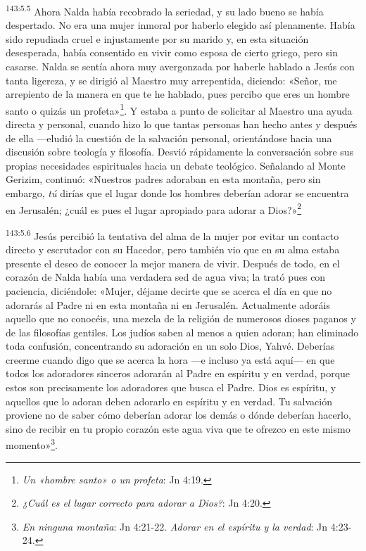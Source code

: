 \par
\textsuperscript{143:5.5} Ahora Nalda había recobrado la seriedad, y su lado bueno se había despertado. No era una mujer inmoral por haberlo elegido así plenamente. Había sido repudiada cruel e injustamente por su marido y, en esta situación desesperada, había consentido en vivir como esposa de cierto griego, pero sin casarse. Nalda se sentía ahora muy avergonzada por haberle hablado a Jesús con tanta ligereza, y se dirigió al Maestro muy arrepentida, diciendo: «Señor, me arrepiento de la manera en que te he hablado, pues percibo que eres un hombre santo o quizás un profeta»\footnote{\textit{Un «hombre santo» o un profeta}: Jn 4:19.}. Y estaba a punto de solicitar al Maestro una ayuda directa y personal, cuando hizo lo que tantas personas han hecho antes y después de ella ---eludió la cuestión de la salvación personal, orientándose hacia una discusión sobre teología y filosofía. Desvió rápidamente la conversación sobre sus propias necesidades espirituales hacia un debate teológico. Señalando al Monte Gerizim, continuó: «Nuestros padres adoraban en esta montaña, pero sin embargo, \textit{tú} dirías que el lugar donde los hombres deberían adorar se encuentra en Jerusalén; ¿cuál es pues el lugar apropiado para adorar a Dios?»\footnote{\textit{¿Cuál es el lugar correcto para adorar a Dios?}: Jn 4:20.}

\par
\textsuperscript{143:5.6} Jesús percibió la tentativa del alma de la mujer por evitar un contacto directo y escrutador con su Hacedor, pero también vio que en su alma estaba presente el deseo de conocer la mejor manera de vivir. Después de todo, en el corazón de Nalda había una verdadera sed de agua viva; la trató pues con paciencia, diciéndole: «Mujer, déjame decirte que se acerca el día en que no adorarás al Padre ni en esta montaña ni en Jerusalén. Actualmente adoráis aquello que no conocéis, una mezcla de la religión de numerosos dioses paganos y de las filosofías gentiles. Los judíos saben al menos a quien adoran; han eliminado toda confusión, concentrando su adoración en un solo Dios, Yahvé. Deberías creerme cuando digo que se acerca la hora ---e incluso ya está aquí--- en que todos los adoradores sinceros adorarán al Padre en espíritu y en verdad, porque estos son precisamente los adoradores que busca el Padre. Dios es espíritu, y aquellos que lo adoran deben adorarlo en espíritu y en verdad. Tu salvación proviene no de saber cómo deberían adorar los demás o dónde deberían hacerlo, sino de recibir en tu propio corazón este agua viva que te ofrezco en este mismo momento»\footnote{\textit{En ninguna montaña}: Jn 4:21-22. \textit{Adorar en el espíritu y la verdad}: Jn 4:23-24.}.

